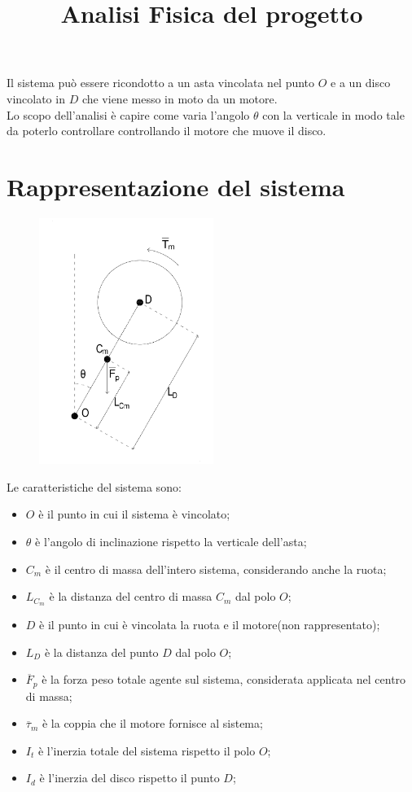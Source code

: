\documentclass[12pt,a4paper,twoside, openright]{scrartcl}
\title{Analisi Fisica del progetto}
\date{\vspace{-5ex}}
\begin{document}
	\pagestyle{plain}
	\maketitle
	Il sistema può essere ricondotto a un asta vincolata nel punto  $O$ e a un disco vincolato in $D$ che viene messo in moto da un motore.\\ 
	Lo scopo dell'analisi è capire come varia l'angolo $\theta$ con la verticale in modo tale da poterlo controllare controllando il motore che muove il disco.
\section{Rappresentazione del sistema}
		\begin{figure}[H]
			\begin{center}
				\includegraphics[height=8cm]{Figura1.pdf}
			\end{center}
			\label{fig:struttura}
		\end{figure}
	Le caratteristiche del sistema sono:
	\begin{itemize}
		\item $O$ è il punto in cui il sistema è vincolato;
		\item $\theta$ è l'angolo di inclinazione rispetto la verticale dell'asta;
		\item $C_m$ è il centro di massa dell'intero sistema, considerando anche la ruota;
		\item $L_{C_m}$ è la distanza del centro di massa $C_m$ dal polo $O$; 
		\item $D$ è il punto in cui è vincolata la ruota e il motore(non rappresentato);
		\item $L_D$ è la distanza del punto $D$ dal polo $O$; 
		\item $\overline{F}_p$ è la forza peso totale agente sul sistema, considerata applicata nel centro di massa;
		\item $ \overline{\tau}_m$ è la coppia che il motore fornisce al sistema;
		\item $I_t$ è l'inerzia totale del sistema rispetto il polo $O$;
		\item $I_d$ è l'inerzia del disco rispetto il punto $D$;
	\end{itemize}
\end{document}
